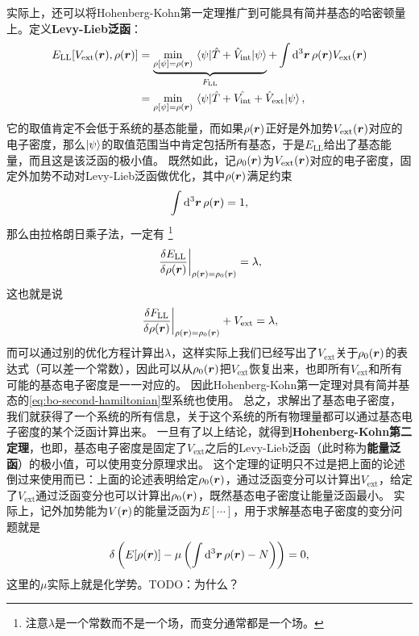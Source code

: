 \documentclass[hyperref, UTF8, a4paper]{ctexart}
\begin{document}
实际上，还可以将Hohenberg-Kohn第一定理推广到可能具有简并基态的哈密顿量上。定义\textbf{Levy-Lieb泛函}：
\begin{equation}
    \begin{aligned}
        E_\text{LL} [V_\text{ext}(\vb*{r}), \rho(\vb*{r})]  &= \underbrace{\min_{\rho[\psi]=\rho(\vb*{r})} \mel{\psi}{\hat{T} + \hat{V}_\text{int}}{\psi}}_{F_\text{LL}} + \int \dd[3]{\vb*{r}} \rho(\vb*{r}) V_\text{ext} (\vb*{r}) \\
        &= \min_{\rho[\psi]=\rho(\vb*{r})} \mel{\psi}{\hat{T} + \hat{V_\text{int}} + \hat{V}_\text{ext}}{\psi},
    \end{aligned}
    \label{eq:levy-lieb}
\end{equation}
它的取值肯定不会低于系统的基态能量，而如果$\rho(\vb*{r})$正好是外加势$V_\text{ext}(\vb*{r})$对应的电子密度，那么$\ket{\psi}$的取值范围当中肯定包括所有基态，于是$E_\text{LL}$给出了基态能量，而且这是该泛函的极小值。
既然如此，记$\rho_0(\vb*{r})$为$V_\text{ext}(\vb*{r})$对应的电子密度，固定外加势不动对Levy-Lieb泛函做优化，其中$\rho(\vb*{r})$满足约束
\[
    \int \dd[3]{\vb*{r}} \rho(\vb*{r}) = 1,
\]
那么由拉格朗日乘子法，一定有%
\footnote{注意$\lambda$是一个常数而不是一个场，而变分通常都是一个场。}%
\[
    \eval{\fdv{E_\text{LL}}{\rho(\vb*{r})}}_{\rho(\vb*{r}) = \rho_0 (\vb*{r})} = \lambda,
\]
这也就是说
\[
    \eval{\fdv{F_\text{LL}}{\rho(\vb*{r})}}_{\rho(\vb*{r}) = \rho_0(\vb*{r})} + V_\text{ext} = \lambda,
\]
而可以通过别的优化方程计算出$\lambda$，这样实际上我们已经写出了$V_\text{ext}$关于$\rho_0(\vb*{r})$的表达式（可以差一个常数），因此可以从$\rho_0(\vb*{r})$把$V_\text{ext}$恢复出来，也即所有$V_\text{ext}$和所有可能的基态电子密度是一一对应的。
因此Hohenberg-Kohn第一定理对具有简并基态的\eqref{eq:bo-second-hamiltonian}型系统也使用。
总之，求解出了基态电子密度，我们就获得了一个系统的所有信息，关于这个系统的所有物理量都可以通过基态电子密度的某个泛函计算出来。
一旦有了以上结论，就得到\textbf{Hohenberg-Kohn第二定理}，也即，基态电子密度是固定了$V_\text{ext}$之后的Levy-Lieb泛函（此时称为\textbf{能量泛函}）的极小值，可以使用变分原理求出。
这个定理的证明只不过是把上面的论述倒过来使用而已：上面的论述表明给定$\rho_0(\vb*{r})$，通过泛函变分可以计算出$V_\text{ext}$，给定了$V_\text{ext}$通过泛函变分也可以计算出$\rho_0(\vb*{r})$，既然基态电子密度让能量泛函最小。
实际上，记外加势能为$V(\vb*{r})$的能量泛函为$E[\cdots]$，用于求解基态电子密度的变分问题就是
\begin{equation}
    \var \left( E[\rho(\vb*{r})] - \mu \left( \int \dd[3]{\vb*{r}} \rho(\vb*{r}) - N \right) \right) = 0,
    \label{eq:dft-variation-principle}
\end{equation}
这里的$\mu$实际上就是化学势。TODO：为什么？
\end{document}
